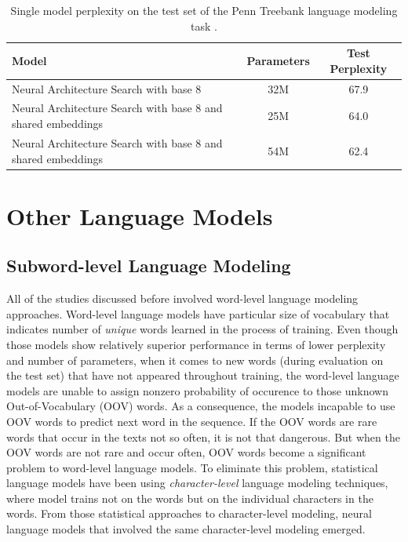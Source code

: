 \documentclass{IEEEtran}
\begin{document}
\begin{table}[!t]
\caption{Single model perplexity on the test set of the Penn Treebank language modeling task \cite{Quoc2017Reinforcement}.}
\label{tab:search}
\centering
\begin{tabular}{ l|c c }
\toprule
\textbf{Model} & \textbf{Parameters} & \textbf{Test Perplexity} \\
\hline
Neural Architecture Search with base 8 & 32M & 67.9 \\
Neural Architecture Search with base 8 and shared embeddings & 25M & 64.0 \\
Neural Architecture Search with base 8 and shared embeddings & 54M & 62.4 \\
\bottomrule
\end{tabular}
\end{table}

\section{Other Language Models}
\subsection{Subword-level Language Modeling}

All of the studies discussed before involved word-level language modeling approaches. Word-level language models have particular size of vocabulary that indicates number of \textit{unique} words learned in the process of training. Even though those models show relatively superior performance in terms of lower perplexity and number of parameters, when it comes to new words (during evaluation on the test set) that have not appeared throughout training, the word-level language models are unable to assign nonzero probability of occurence to those unknown Out-of-Vocabulary (OOV) words. As a consequence, the models incapable to use OOV words to predict next word in the sequence. If the OOV words are rare words that occur in the texts not so often, it is not that dangerous. But when the OOV words are not rare and occur often, OOV words become a significant problem to word-level language models. To eliminate this problem, statistical language models have been using \textit{character-level} language modeling techniques, where model trains not on the words but on the individual characters in the words. From those statistical approaches to character-level modeling, neural language models that involved the same character-level modeling emerged.
\end{document}

